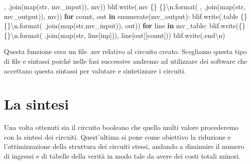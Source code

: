 \documentclass[
]{book}
\newenvironment{Shaded}{\begin{snugshade}}{\end{snugshade}}
\newcommand{\BuiltInTok}[1]{#1}
\newcommand{\CharTok}[1]{\textcolor[rgb]{0.31,0.60,0.02}{#1}}
\newcommand{\ControlFlowTok}[1]{\textcolor[rgb]{0.13,0.29,0.53}{\textbf{#1}}}
\newcommand{\KeywordTok}[1]{\textcolor[rgb]{0.13,0.29,0.53}{\textbf{#1}}}
\newcommand{\NormalTok}[1]{#1}
\newcommand{\SpecialCharTok}[1]{\textcolor[rgb]{0.00,0.00,0.00}{#1}}
\newcommand{\StringTok}[1]{\textcolor[rgb]{0.31,0.60,0.02}{#1}}
\begin{document}
\begin{Shaded}
\begin{Highlighting}[]
      \StringTok{\textquotesingle{}, \textquotesingle{}}\NormalTok{.join(}\BuiltInTok{map}\NormalTok{(}\BuiltInTok{str}\NormalTok{, mv\_input)), mv))}
\NormalTok{  blif.write(}\StringTok{\textquotesingle{}.mv }\SpecialCharTok{\{\}}\StringTok{ }\SpecialCharTok{\{\}}\CharTok{\textbackslash{}n}\StringTok{\textquotesingle{}}\NormalTok{.}\BuiltInTok{format}\NormalTok{(}
      \StringTok{\textquotesingle{}, \textquotesingle{}}\NormalTok{.join(}\BuiltInTok{map}\NormalTok{(}\BuiltInTok{str}\NormalTok{, mv\_output)), mv))}
  \ControlFlowTok{for}\NormalTok{ count, out }\KeywordTok{in} \BuiltInTok{enumerate}\NormalTok{(mv\_output):}
\NormalTok{      blif.write(}\StringTok{\textquotesingle{}.table }\SpecialCharTok{\{\}}\StringTok{ }\SpecialCharTok{\{\}}\CharTok{\textbackslash{}n}\StringTok{\textquotesingle{}}\NormalTok{.}\BuiltInTok{format}\NormalTok{(}\StringTok{\textquotesingle{} \textquotesingle{}}\NormalTok{.join(}\BuiltInTok{map}\NormalTok{(}\BuiltInTok{str}\NormalTok{,mv\_input)), out))}
    \ControlFlowTok{for}\NormalTok{ line }\KeywordTok{in}\NormalTok{ mv\_table:}
\NormalTok{      blif.write(}\StringTok{\textquotesingle{}}\SpecialCharTok{\{\}}\StringTok{ }\SpecialCharTok{\{\}}\CharTok{\textbackslash{}n}\StringTok{\textquotesingle{}}\NormalTok{.}\BuiltInTok{format}\NormalTok{(}
        \StringTok{\textquotesingle{} \textquotesingle{}}\NormalTok{.join(}\BuiltInTok{map}\NormalTok{(}\BuiltInTok{str}\NormalTok{, line[}\StringTok{\textquotesingle{}inp\textquotesingle{}}\NormalTok{])), line[}\StringTok{\textquotesingle{}out\textquotesingle{}}\NormalTok{][count]))}
\NormalTok{  blif.write(}\StringTok{\textquotesingle{}.end}\CharTok{\textbackslash{}n}\StringTok{\textquotesingle{}}\NormalTok{)}
\end{Highlighting}
\end{Shaded}

Questa funzione crea un file .mv relativo al circuito creato. Scegliamo questa tipo di file e sintassi poiché nelle fasi successive andremo ad utilizzare dei software che accettano questa sintassi per valutare e sintetizzare i circuiti.

\newpage

\hypertarget{la-sintesi}{%
\section{La sintesi}\label{la-sintesi}}

Una volta ottenuti sia il circuito booleano che quello multi valore procederemo con la sintesi dei circuiti. Quest'ultima si pone come obiettivo la riduzione e l'ottimizzazione della struttura dei circuiti stessi, andando a diminuire il numero di ingressi e di tabelle della verità in modo tale da avere dei costi totali minori.
\end{document}
